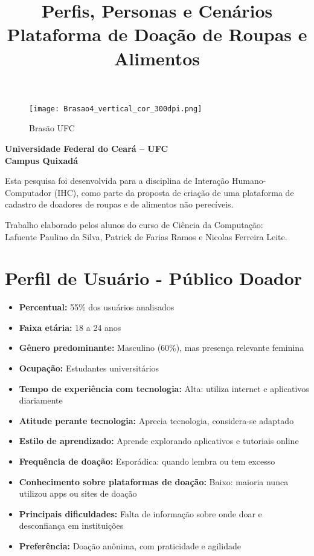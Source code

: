 \documentclass[a4paper,12pt]{article}
\title{Perfis, Personas e Cenários \\ \large Plataforma de Doação de Roupas e Alimentos}
\author{}
\date{}
\begin{document}
\begin{figure}
    \centering
    \texttt{[image: Brasao4\_vertical\_cor\_300dpi.png]}
    \caption{Brasão UFC}
    \label{fig:enter-label}
\end{figure}

\begin{center}
    \textbf{Universidade Federal do Ceará – UFC \\
    Campus Quixadá}
    
    \vspace{0.3cm}
    
    Esta pesquisa foi desenvolvida para a disciplina de Interação Humano-Computador (IHC), como parte da proposta de criação de uma plataforma de cadastro de doadores de roupas e de alimentos não perecíveis.

    \vspace{0.3cm}

    Trabalho elaborado pelos alunos do curso de Ciência da Computação: \\
    Lafuente Paulino da Silva, Patrick de Farias Ramos e Nicolas Ferreira Leite.
\end{center}

\vspace{1cm}

\maketitle

\section{Perfil de Usuário - Público Doador}

\begin{itemize}
    \item \textbf{Percentual:} 55\% dos usuários analisados
    \item \textbf{Faixa etária:} 18 a 24 anos
    \item \textbf{Gênero predominante:} Masculino (60\%), mas presença relevante feminina
    \item \textbf{Ocupação:} Estudantes universitários
    \item \textbf{Tempo de experiência com tecnologia:} Alta: utiliza internet e aplicativos diariamente
    \item \textbf{Atitude perante tecnologia:} Aprecia tecnologia, considera-se adaptado
    \item \textbf{Estilo de aprendizado:} Aprende explorando aplicativos e tutoriais online
    \item \textbf{Frequência de doação:} Esporádica: quando lembra ou tem excesso
    \item \textbf{Conhecimento sobre plataformas de doação:} Baixo: maioria nunca utilizou apps ou sites de doação
    \item \textbf{Principais dificuldades:} Falta de informação sobre onde doar e desconfiança em instituições
    \item \textbf{Preferência:} Doação anônima, com praticidade e agilidade
\end{itemize}
\end{document}
